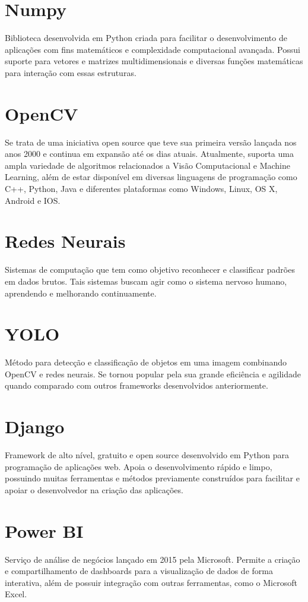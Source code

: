 \section{Numpy}
\indent
\par Biblioteca desenvolvida em Python criada para facilitar o desenvolvimento de aplicações com fins matemáticos e complexidade computacional avançada. Possui suporte para vetores e matrizes multidimensionais e diversas funções matemáticas para interação com essas estruturas.

\section{OpenCV}
\indent
\par Se trata de uma iniciativa open source que teve sua primeira versão lançada nos anos 2000 e continua em expansão até os dias atuais. Atualmente, suporta uma ampla variedade de algoritmos relacionados a Visão Computacional e Machine Learning, além de estar disponível em diversas linguagens de programação como C++, Python, Java e diferentes plataformas como Windows, Linux, OS X, Android e IOS.

\section{Redes Neurais}
\indent
\par Sistemas de computação que tem como objetivo reconhecer e classificar padrões em dados brutos. Tais sistemas buscam agir como o sistema nervoso humano, aprendendo e melhorando continuamente.

\section{YOLO}
\indent
\par Método para detecção e classificação de objetos em uma imagem combinando OpenCV e redes neurais. Se tornou popular pela sua grande eficiência e agilidade quando comparado com outros frameworks desenvolvidos anteriormente.

\section{Django}
\indent
\par Framework de alto nível, gratuito e open source desenvolvido em Python para programação de aplicações web. Apoia o desenvolvimento rápido e limpo, possuindo muitas ferramentas e métodos previamente construídos para facilitar e apoiar o desenvolvedor na criação das aplicações.

\section{Power BI}
\indent
\par Serviço de análise de negócios lançado em 2015 pela Microsoft. Permite a criação e compartilhamento de dashboards para a visualização de dados de forma interativa, além de possuir integração com outras ferramentas, como o Microsoft Excel.


